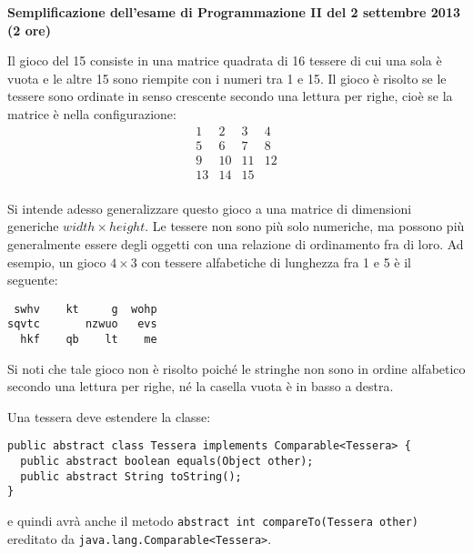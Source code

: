 \documentclass{article}[10pt]
\begin{document}
\begin{center} {\bf Semplificazione dell'esame di Programmazione II del 2 settembre 2013 (2 ore)}\end{center}

Il gioco del 15 consiste in una matrice quadrata di 16 tessere di cui una sola \`e
vuota e le altre 15 sono riempite con i numeri tra 1 e 15. Il gioco \`e risolto se
le tessere sono ordinate in senso crescente secondo una lettura per righe,
cio\`e se la matrice \`e nella configurazione:
%
\[\begin{array}{cccc}
 1 & 2 & 3 & 4\\
 5 & 6 & 7 & 8\\
 9 & 10 & 11 & 12\\
 13 & 14 & 15 & \\
\end{array}\]

Si intende adesso generalizzare questo gioco a una matrice di dimensioni generiche
$\mathit{width}\times\mathit{height}$. Le tessere non sono
pi\`u solo numeriche, ma possono pi\`u generalmente essere degli oggetti
con una relazione di ordinamento fra di loro. Ad esempio, un gioco
$4\times 3$ con tessere alfabetiche di lunghezza fra 1 e 5 \`e il seguente:
%
{\small
\begin{verbatim}
 swhv    kt     g  wohp 
sqvtc       nzwuo   evs 
  hkf    qb    lt    me 
\end{verbatim}
}

\noindent
Si noti che tale gioco non \`e risolto poich\'e le stringhe non sono in ordine
alfabetico secondo una lettura per righe, n\'e la casella vuota \`e in basso a destra.

Una tessera deve estendere la classe:
{\small
\begin{verbatim}
public abstract class Tessera implements Comparable<Tessera> {
  public abstract boolean equals(Object other);
  public abstract String toString();
}
\end{verbatim}
}

\noindent
e quindi avr\`a anche il metodo \texttt{abstract int compareTo(Tessera other)} ereditato
da \texttt{java.lang.Comparable<Tessera>}.
\end{document}
